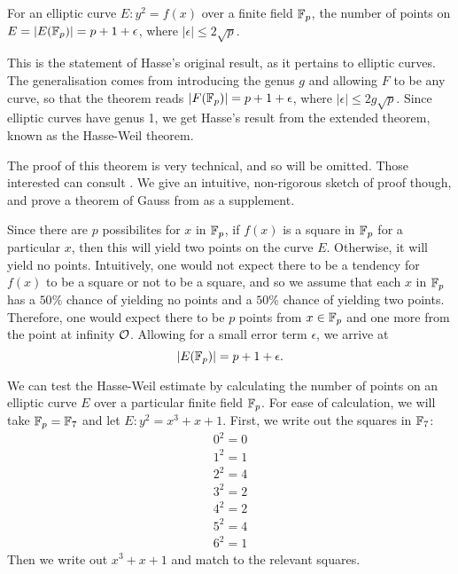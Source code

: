 
\begin{theorem}
	For an elliptic curve $E: y^2 = f(x)$ over a finite field $\fp$, the number of points on $E = |E(\fp)| = p + 1 + \epsilon$, where $|\epsilon| \leq 2\sqrt{p}$.
\end{theorem}
This is the statement of Hasse's original result, as it pertains to elliptic curves.
The generalisation comes from introducing the genus $g$ and allowing $F$ to be any curve, so that the theorem reads $|F(\fp)| = p + 1 + \epsilon$, where $|\epsilon| \leq 2g\sqrt{p}$.
Since elliptic curves have genus 1, we get Hasse's result from the extended theorem, known as the Hasse-Weil theorem.
\begin{sproof}
	The proof of this theorem is very technical, and so will be omitted.
	Those interested can consult \cite{hasse1936a,hasse1936b,hasse1936c}.
	We give an intuitive, non-rigorous sketch of proof though, and prove a theorem of Gauss from \cite{tate2013} as a supplement.

	Since there are $p$ possibilites for $x$ in $\fp$, if $f(x)$ is a square in $\fp$ for a particular $x$, then this will yield two points on the curve $E$.
	Otherwise, it will yield no points.
	Intuitively, one would not expect there to be a tendency for $f(x)$ to be a square or not to be a square, and so we assume that each $x$ in $\fp$ has a $50\%$ chance of yielding no points and a $50\%$ chance of yielding two points.
	Therefore, one would expect there to be $p$ points from $x \in \fp$ and one more from the point at infinity $\pai$.
	Allowing for a small error term $\epsilon$, we arrive at
	$$|E(\fp)| = p + 1 + \epsilon.$$
\end{sproof}
We can test the Hasse-Weil estimate by calculating the number of points on an elliptic curve $E$ over a particular finite field $\fp$.
For ease of calculation, we will take $\fp = \fp[7]$ and let $E : y^2 = x^3 + x + 1$.
First, we write out the squares in $\fp[7]$:
\begin{align*}
0^2 = 0\\
1^2 = 1\\
2^2 = 4\\
3^2 = 2\\
4^2 = 2\\
5^2 = 4\\
6^2 = 1
\end{align*}
Then we write out $x^3+x+1$ and match to the relevant squares.
